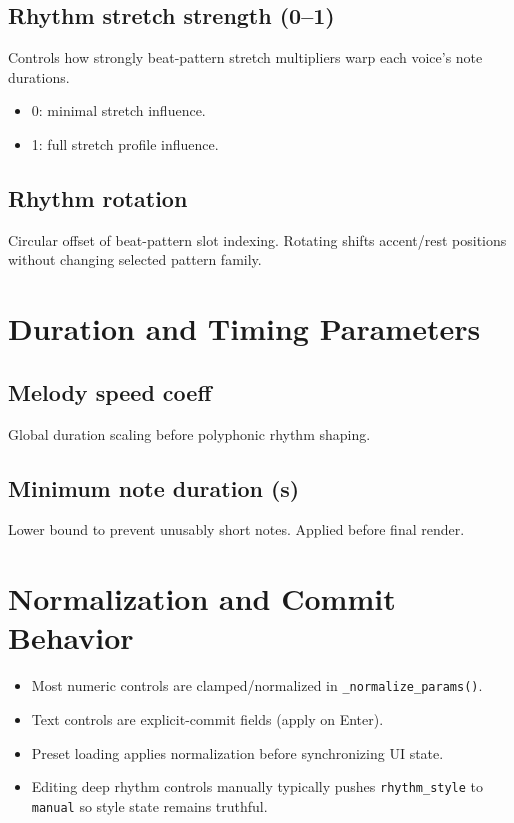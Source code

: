 \documentclass[11pt,a4paper]{article}
\begin{document}
\subsection*{Rhythm stretch strength (0--1)}
Controls how strongly beat-pattern stretch multipliers warp each voice's note durations.
\begin{itemize}
  \item 0: minimal stretch influence.
  \item 1: full stretch profile influence.
\end{itemize}

\subsection*{Rhythm rotation}
Circular offset of beat-pattern slot indexing. Rotating shifts accent/rest positions without changing selected pattern family.

\section{Duration and Timing Parameters}
\subsection*{Melody speed coeff}
Global duration scaling before polyphonic rhythm shaping.

\subsection*{Minimum note duration (s)}
Lower bound to prevent unusably short notes. Applied before final render.

\section{Normalization and Commit Behavior}
\begin{itemize}
  \item Most numeric controls are clamped/normalized in \texttt{\_normalize\_params()}.
  \item Text controls are explicit-commit fields (apply on Enter).
  \item Preset loading applies normalization before synchronizing UI state.
  \item Editing deep rhythm controls manually typically pushes \texttt{rhythm\_style} to \texttt{manual} so style state remains truthful.
\end{itemize}
\end{document}
